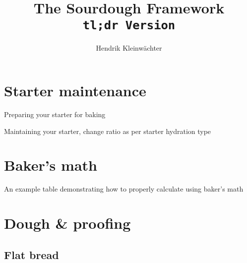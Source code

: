 \documentclass[paper=a4, twoside=false, fontsize=12pt]{scrbook}
\author{Hendrik Kleinwächter}
\title{The Sourdough Framework\\\texttt{tl;dr Version}}
\begin{document}
\maketitle

\section*{Starter maintenance}
\begin{flowchart}[!htb]
    \centering
    
    \caption*{Preparing your starter for baking}
\end{flowchart}

\begin{flowchart}[!htb]
    \centering
    
    \caption*{Maintaining your starter, change ratio as per starter hydration
    type}
\end{flowchart}

\clearpage{}
\section*{Baker's math}
\begin{table}[!htb]
  \centering
  
  \caption*{An example table demonstrating how to properly calculate using
  baker's math}
\end{table}

\section*{Dough \& proofing}
\subsection*{Flat bread}

\clearpage{}
\end{document}
